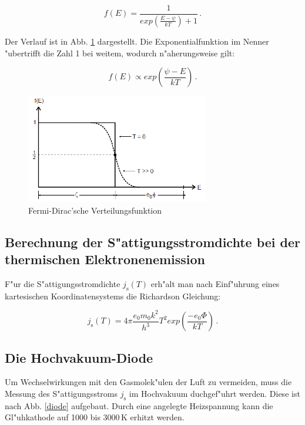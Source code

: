 \begin{equation}
	f(E) = \frac{1}{exp( \frac{E - \psi}{kT} ) + 1} \, .
\end{equation}

Der Verlauf ist in Abb. \ref{fermi} dargestellt.
Die Exponentialfunktion im Nenner "ubertrifft die Zahl 1 bei weitem, wodurch n"aherungsweise gilt:

\begin{equation}
	f(E) \propto exp ( \frac{\psi - E}{kT}) \, .
\end{equation}

\begin{figure}[!h]
	\centering
	\includegraphics[width = 8cm]{img/Fermi.PNG}
	\caption{Fermi-Dirac'sche Verteilungsfunktion}
	\label{fermi}
\end{figure}

\subsection{Berechnung der S"attigungsstromdichte bei der thermischen Elektronenemission} %
\label{sub:berechnung_der_s_attigungsstromdichte_bei_der_thermischen_elektronenemission}

F"ur die S"attigungsstromdichte $j_\mathrm{s}(T)$ erh"alt man nach Einf"uhrung eines kartesischen Koordinatensystems die Richardson Gleichung:

\begin{equation}
	j_\mathrm{s}(T) = 4\pi \frac{e_\mathrm{0} m_\mathrm{0} k^2}{h^3} T^2 exp( \frac{-e_\mathrm{0} \Phi}{kT}) \, .
\end{equation}

\subsection{Die Hochvakuum-Diode} %
\label{sub:die_hochvakuum_diode}

Um Wechselwirkungen mit den Gasmolek"ulen der Luft zu vermeiden, muss die Messung des S"attigungsstroms $j_\mathrm{s}$ im Hochvakuum duchgef"uhrt werden.
Diese ist nach Abb. \ref{diode} aufgebaut.
Durch eine angelegte Heizspannung kann die Gl"uhkathode auf 1000 bis 3000\,K erhitzt werden.

